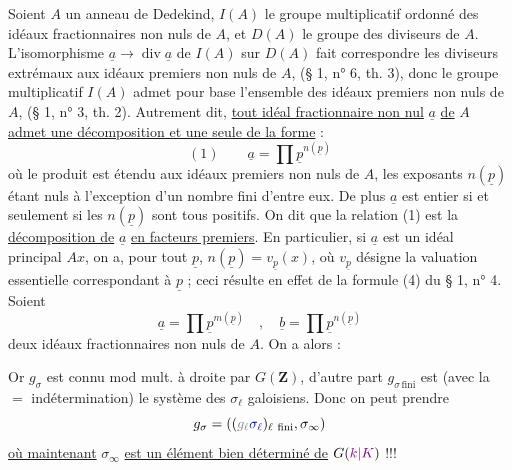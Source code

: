 Soient $A$ un anneau de Dedekind, $I(A)$ le groupe multiplicatif ordonné des idéaux fractionnaires non nuls de $A$, et $D(A)$ le groupe des diviseurs de $A$. L'isomorphisme $\underline a\longrightarrow\operatorname{div}\underline a$ de $I(A)$ sur $D(A)$ fait correspondre les diviseurs extrémaux aux idéaux premiers non nuls de $A$, (§ 1, n° 6, th. 3), donc le groupe multiplicatif $I(A)$ admet pour base l'ensemble des idéaux premiers non nuls de $A$, (§ 1, n° 3, th. 2). Autrement dit, \uline{tout idéal fractionnaire non nul} $\underline a$ \uline{de} $A$ \uline{admet une décomposition et une seule de la forme} :
\[
(1)\qquad\underline a=\prod\underline p^{n(\underline p)}
\]
où le produit est étendu aux idéaux premiers non nuls de $A$, les exposants $n(\underline p)$ étant nuls à l'exception d'un nombre fini d'entre eux. De plus $\underline a$ est entier si et seulement si les $n(\underline p)$ sont tous positifs. On dit que la relation (1) est la \uline{décomposition de} $\underline a$ \uline{en facteurs premiers}. En particulier, si $\underline a$ est un idéal principal $Ax$, on a, pour tout $\underline p$, $n(\underline p)=v_{\underline p}(x)$, où $v_{\underline p}$ désigne la valuation essentielle correspondant à $\underline p$ ; ceci résulte en effet de la formule (4) du § 1, n° 4. Soient
\[
\underline a=\prod\underline p^{m(\underline p)}\quad,\quad\underline b=\prod\underline p^{n(\underline p)}
\]
deux idéaux fractionnaires non nuls de $A$. On a alors :


Or $g_\sigma$ est connu mod mult. à droite par $G(\mathbf Z)$, d'autre part $g_{\sigma\,\mathrm{fini}}$ est (avec la $=$ indétermination) le système des $\sigma_\ell$ galoisiens. Donc on peut prendre
\[
g_\sigma=((\deleted{g_\ell}\inserted{\sigma_\ell})_{\ell\ \mathrm{fini}},\sigma_\infty)
\]
\uline{où maintenant} $\sigma_\infty$ \uline{est un élément bien déterminé de} $G(\unsure{k|K})$ !!!

